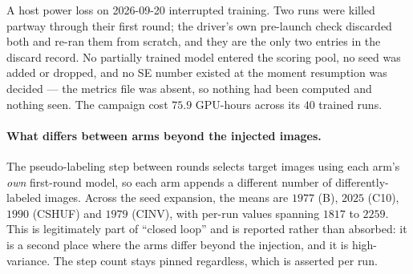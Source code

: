 \documentclass{article}
\begin{document}
A host power loss on 2026-09-20 interrupted training. Two runs were killed partway through their
first round; the driver's own pre-launch check discarded both and re-ran them from scratch, and they
are the only two entries in the discard record. No partially trained model entered the scoring pool,
no seed was added or dropped, and no SE number existed at the moment resumption was decided --- the
metrics file was absent, so nothing had been computed and nothing seen. The campaign cost $75.9$
GPU-hours across its $40$ trained runs.

\paragraph{What differs between arms beyond the injected images.} The pseudo-labeling step between
rounds selects target images using each arm's \emph{own} first-round model, so each arm appends a
different number of differently-labeled images. Across the seed expansion, the means are $1977$ (B),
$2025$ (C10), $1990$ (CSHUF) and $1979$ (CINV), with per-run values spanning $1817$ to $2259$. This
is legitimately part of ``closed loop'' and is reported rather than absorbed: it is a second place where the arms differ beyond the injection, and it is high-variance. The step count stays pinned
regardless, which is asserted per run.
\end{document}
